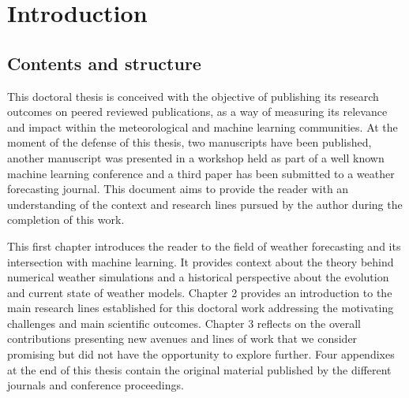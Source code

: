 
\chapter{Introduction} %

\label{Chapter1} %


\newcommand{\keyword}[1]{\textbf{#1}}
\newcommand{\tabhead}[1]{\textbf{#1}}
\newcommand{\code}[1]{\texttt{#1}}
\newcommand{\file}[1]{\texttt{\bfseries#1}}
\newcommand{\option}[1]{\texttt{\itshape#1}}


\section{Contents and structure}

This doctoral thesis is conceived with the objective of publishing its research outcomes on peered reviewed publications, as a way of measuring its relevance and impact within the meteorological and machine learning communities. At the moment of the defense of this thesis, two manuscripts have been published, another manuscript was presented in a workshop held as part of a well known machine learning conference and a third paper has been submitted to a weather forecasting journal. This document aims to provide the reader with an understanding of the context and research lines pursued by the author during the completion of this work.

\medskip

This first chapter introduces the reader to the field of weather forecasting and its intersection with machine learning. It provides context about the theory behind numerical weather simulations and a historical perspective about the evolution and current state of weather models. Chapter 2 provides an introduction to the main research lines established for this doctoral work  addressing the motivating challenges and main scientific outcomes. Chapter 3 reflects on the overall contributions presenting new avenues and lines of work that we consider promising but did not have the opportunity to explore further. Four appendixes at the end of this thesis contain the original material published by the different journals and conference proceedings. 

